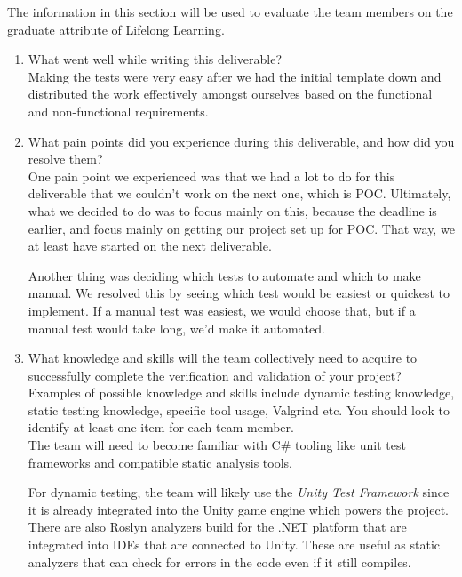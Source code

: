 \documentclass[12pt, titlepage]{article}
\begin{document}
The information in this section will be used to evaluate the team members on the
graduate attribute of Lifelong Learning.



\begin{enumerate}
  \item What went well while writing this deliverable? \\

        Making the tests were very easy after we had the initial template down and distributed the work effectively amongst ourselves based on the functional and non-functional requirements.

  \item What pain points did you experience during this deliverable, and how did you resolve them?\\

        One pain point we experienced was that we had a lot to do for this deliverable that we couldn't work on the next one, which is POC. Ultimately, what we decided to do was to focus mainly on this, because the deadline is earlier, and focus mainly on getting our project set up for POC. That way, we at least have started on the next deliverable.

        Another thing was deciding which tests to automate and which to make manual. We resolved this by seeing which test would be easiest or quickest to implement. If a manual test was easiest, we would choose that, but if a manual test would take long, we'd make it automated.\\

  \item What knowledge and skills will the team collectively need to acquire to successfully complete the verification and validation of your project? Examples of possible knowledge and skills include dynamic testing knowledge, static testing knowledge, specific tool usage, Valgrind etc. You should look to identify at least one item for each team member.\\

        The team will need to become familiar with C\# tooling like unit test frameworks and compatible static analysis tools.

        For dynamic testing, the team will likely use the \textit{Unity Test Framework} since it is already integrated into the Unity game engine which powers the project. There are also Roslyn analyzers build for the .NET platform that are integrated into IDEs that are connected to Unity. These are useful as static analyzers that can check for errors in the code even if it still compiles.


\end{enumerate}
\end{document}
